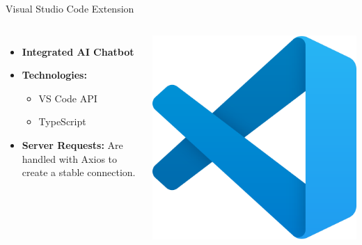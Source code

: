 \documentclass{beamer}
\begin{document}
\begin{frame}{Visual Studio Code Extension}
  \begin{columns}
      \begin{itemize}
        \item \textbf{Integrated AI Chatbot}
        \item \textbf{Technologies:}
        \begin{itemize}
          \item VS Code API
          \item TypeScript
        \end{itemize}
        \item \textbf{Server Requests:} Are handled with Axios to create a stable connection.
      \end{itemize}
      \centering
      \includegraphics[width=\textwidth]{VSCode.png}
  \end{columns}
\end{frame}
\end{document}
